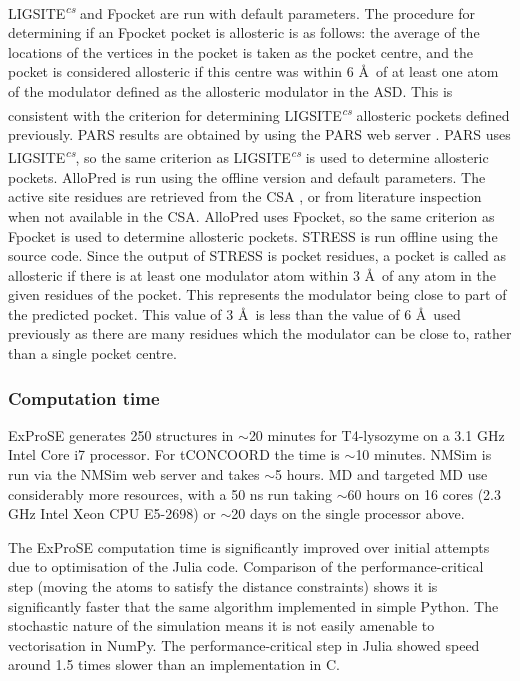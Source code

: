 LIGSITE\textsuperscript{\it cs} \cite{Huang2006} and Fpocket \cite{LeGuilloux2009} are run with default parameters.
The procedure for determining if an Fpocket pocket is allosteric is as follows: the average of the locations of the vertices in the pocket is taken as the pocket centre, and the pocket is considered allosteric if this centre was within 6 \AA\ of at least one atom of the modulator defined as the allosteric modulator in the ASD.
This is consistent with the criterion for determining LIGSITE\textsuperscript{\it cs} allosteric pockets defined previously.
PARS results are obtained by using the PARS web server \cite{Panjkovich2014}.
PARS uses LIGSITE\textsuperscript{\it cs}, so the same criterion as LIGSITE\textsuperscript{\it cs} is used to determine allosteric pockets.
AlloPred is run using the offline version and default parameters.
The active site residues are retrieved from the CSA \cite{Furnham2014}, or from literature inspection when not available in the CSA.
AlloPred uses Fpocket, so the same criterion as Fpocket is used to determine allosteric pockets.
STRESS \cite{Clarke2016} is run offline using the source code.
Since the output of STRESS is pocket residues, a pocket is called as allosteric if there is at least one modulator atom within 3 \AA\ of any atom in the given residues of the pocket.
This represents the modulator being close to part of the predicted pocket.
This value of 3 \AA\ is less than the value of 6 \AA\ used previously as there are many residues which the modulator can be close to, rather than a single pocket centre.


\subsubsection{Computation time}

ExProSE generates 250 structures in $\sim$20 minutes for T4-lysozyme on a 3.1 GHz Intel Core i7 processor.
For tCONCOORD the time is $\sim$10 minutes.
NMSim is run via the NMSim web server and takes $\sim$5 hours.
MD and targeted MD use considerably more resources, with a 50 ns run taking $\sim$60 hours on 16 cores (2.3 GHz Intel Xeon CPU E5-2698) or $\sim$20 days on the single processor above.

The ExProSE computation time is significantly improved over initial attempts due to optimisation of the Julia code.
Comparison of the performance-critical step (moving the atoms to satisfy the distance constraints) shows it is significantly faster that the same algorithm implemented in simple Python.
The stochastic nature of the simulation means it is not easily amenable to vectorisation in NumPy.
The performance-critical step in Julia showed speed around 1.5 times slower than an implementation in C.


